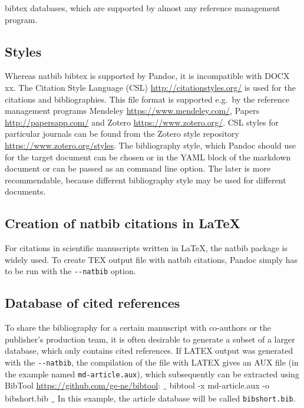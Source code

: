 \documentclass[10pt,fleqn]{wlpeerj}
\begin{document}
bibtex
databases,
which
are
supported
by
almost
any
reference
management
program.

\subsection{Styles}\label{styles}

Whereas
natbib
bibtex
is
supported
by
Pandoc,
it is
incompatible
with
DOCX
xx.
The
Citation
Style
Language
(CSL)
\url{http://citationstyles.org/}
is
used
for
the
citations
and
bibliographies.
This
file
format
is
supported
e.g.~by
the
reference
management
programs
Mendeley
\url{https://www.mendeley.com/},
Papers
\url{http://papersapp.com/}
and
Zotero
\url{https://www.zotero.org/}.
CSL
styles
for
particular
journals
can
be
found
from
the
Zotero
style
repository
\url{https://www.zotero.org/styles}.
The
bibliography
style,
which
Pandoc
should
use
for
the
target
document
can
be
chosen
or in
the
YAML
block
of
the
markdown
document
or
can
be
passed
as an
command
line
option.
The
later
is
more
recommendable,
because
different
bibliography
style
may
be
used
for
different
documents.

\subsection{Creation
of
natbib
citations
in
LaTeX}\label{creation-of-natbib-citations-in-latex}

For
citations
in
scientific
manuscripts
written
in
LaTeX,
the
natbib
package
is
widely
used.
To
create
TEX
output
file
with
natbib
citations,
Pandoc
simply
has
to be
run
with
the
\texttt{-\/-natbib}
option.

\subsection{Database
of
cited
references}\label{database-of-cited-references}

To
share
the
bibliography
for a
certain
manuscript
with
co-authors
or
the
publisher's
production
team,
it is
often
desirable
to
generate
a
subset
of a
larger
database,
which
only
contains
cited
references.
If
LATEX
output
was
generated
with
the
\texttt{-\/-natbib},
the
compilation
of
the
file
with
LATEX
gives
an
AUX
file
(in
the
example
named
\texttt{md-article.aux}),
which
subsequently
can
be
extracted
using
BibTool
\url{https://github.com/ge-ne/bibtool}:
\textsubscript{\textasciitilde{}}
bibtool
-x
md-article.aux
-o
bibshort.bib
\textsubscript{\textasciitilde{}}
In
this
example,
the
article
database
will
be
called
\texttt{bibshort.bib}.
\end{document}
